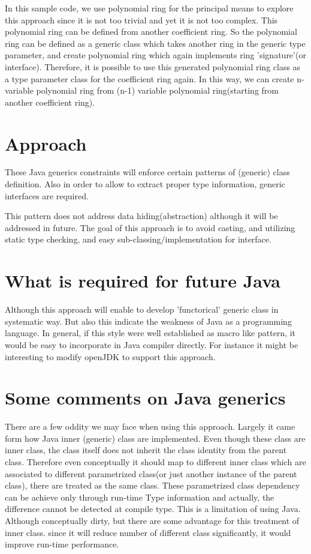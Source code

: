 \documentclass[8pt]{article}
\begin{document}
In this sample code, we use polynomial ring for the principal means to explore this approach since it is not too trivial and yet it is not too complex.
This polynomial ring can be defined from another coefficient ring.
So the polynomial ring can be defined as a generic class which takes another ring in the generic type parameter, and create polynomial ring which again implements ring 'signature'(or interface).
Therefore, it is possible to use this generated polynomial ring class as a type parameter class for the coefficient ring again.
In this way, we can create n-variable polynomial ring from (n-1) variable polynomial ring(starting from another coefficient ring).

\section{Approach}
These Java generics constraints will enforce certain patterns of (generic) class definition.
Also in order to allow to extract proper type information, generic interfaces are required.

This pattern does not address data hiding(abstraction) although it will be addressed in future.
The goal of this approach is to avoid casting, and utilizing static type checking, and easy sub-classing/implementation for interface.

\section{What is required for future Java}
Although this approach will enable to develop 'functorical' generic class in systematic way.
But also this indicate the weakness of Java as a programming language.
In general, if this style were well established as macro like pattern, it would be easy to incorporate in Java compiler directly.
For instance it might be interesting to modify openJDK to support this approach.

\section{Some comments on Java generics}
There are a few oddity we may face when using this approach.
Largely it came form how Java inner (generic) class are implemented.
Even though these class are inner class, the class itself does not inherit the class identity from the parent class. Therefore even conceptually it should map to different inner class which are associated to different parametrized class(or just another instance of the parent class), there are treated as the same class.
These parametrized class dependency can be achieve only through run-time Type information and actually, the difference cannot be detected at compile type. This is a limitation of using Java.
Although conceptually dirty, but there are some advantage for this treatment of inner class. since it will reduce number of different class significantly, it would improve run-time performance.
\end{document}
